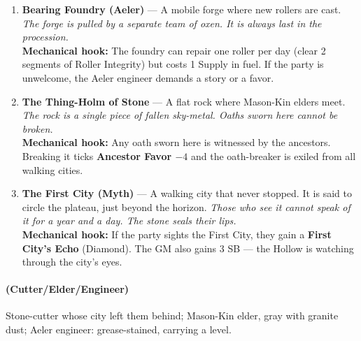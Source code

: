 \begin{enumerate}
\item[Q] \textbf{Bearing Foundry (Aeler)} --- A mobile forge where new rollers are cast.
  \hfill \textit{The forge is pulled by a separate team of oxen. It is always last in the procession.} \\
  \textbf{Mechanical hook:} The foundry can repair one roller per day (clear 2 segments of Roller Integrity) but costs 1 Supply in fuel. If the party is unwelcome, the Aeler engineer demands a story or a favor.

\item[K] \textbf{The Thing-Holm of Stone} --- A flat rock where Mason-Kin elders meet.
  \hfill \textit{The rock is a single piece of fallen sky-metal. Oaths sworn here cannot be broken.} \\
  \textbf{Mechanical hook:} Any oath sworn here is witnessed by the ancestors. Breaking it ticks \textbf{Ancestor Favor $-4$} and the oath-breaker is exiled from all walking cities.

\item[A] \textbf{The First City (Myth)} --- A walking city that never stopped. It is said to circle the plateau, just beyond the horizon.
  \hfill \textit{Those who see it cannot speak of it for a year and a day. The stone seals their lips.} \\
  \textbf{Mechanical hook:} If the party sights the First City, they gain a \textbf{First City's Echo} (Diamond). The GM also gains 3 SB --- the Hollow is watching through the city's eyes.
\end{enumerate}

\paragraph*{(Cutter/Elder/Engineer)} Stone-cutter whose city left them behind; Mason-Kin elder, gray with granite dust; Aeler engineer: grease-stained, carrying a level.

